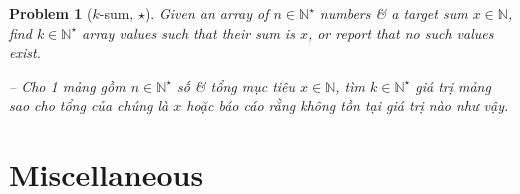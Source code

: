 \documentclass{article}
\newtheorem{problem}{Problem}
\begin{document}
\begin{problem}[$k$-sum, $\star$]
    Given an array of $n\in\mathbb{N}^\star$ numbers \& a target sum $x\in\mathbb{N}$, find $k\in\mathbb{N}^\star$ array values such that their sum is $x$, or report that no such values exist.

    -- Cho 1 mảng gồm $n\in\mathbb{N}^\star$ số \& tổng mục tiêu $x\in\mathbb{N}$, tìm $k\in\mathbb{N}^\star$ giá trị mảng sao cho tổng của chúng là $x$ hoặc báo cáo rằng không tồn tại giá trị nào như vậy.
\end{problem}


\section{Miscellaneous}


\printbibliography[heading=bibintoc]
\end{document}

